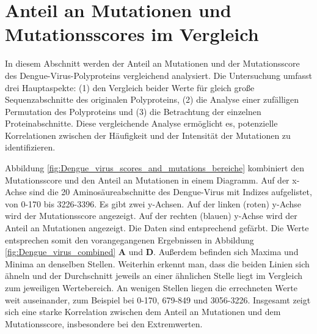 \documentclass[german,version-2022-01]{uzl-thesis}
\begin{document}
\section{Anteil an Mutationen und Mutationsscores im Vergleich}
In diesem Abschnitt werden der Anteil an Mutationen und der Mutationsscore des Dengue-Virus-Polyproteins vergleichend analysiert. Die Untersuchung umfasst drei Hauptaspekte: (1) den Vergleich beider Werte f\"ur gleich gro\ss{}e Sequenzabschnitte des originalen Polyproteins, (2) die Analyse einer zuf\"alligen Permutation des Polyproteins und (3) die Betrachtung der einzelnen Proteinabschnitte. Diese vergleichende Analyse erm\"oglicht es, potenzielle Korrelationen zwischen der H\"aufigkeit und der Intensit\"at der Mutationen zu identifizieren.

Abbildung \ref{fig:Dengue_virus_scores_and_mutations_bereiche} kombiniert den Mutationsscore und den Anteil an Mutationen in einem Diagramm. Auf der x-Achse sind die 20 Aminos\"aureabschnitte des Dengue-Virus mit Indizes aufgelistet, von 0-170 bis 3226-3396. Es gibt zwei y-Achsen. Auf der linken (roten) y-Achse wird der Mutationsscore angezeigt. Auf der rechten (blauen) y-Achse wird der Anteil an Mutationen angezeigt. Die Daten sind entsprechend gef\"arbt. Die Werte entsprechen somit den vorangegangenen Ergebnissen in Abbildung \ref{fig:Dengue_virus_combined} \textbf{A} und \textbf{D}. Au\ss{}erdem befinden sich Maxima und Minima an denselben Stellen. Weiterhin erkennt man, dass die beiden Linien sich \"ahneln und der Durchschnitt jeweils an einer \"ahnlichen Stelle liegt im Vergleich zum jeweiligen Wertebereich. An wenigen Stellen liegen die errechneten Werte weit auseinander, zum Beispiel bei 0-170, 679-849 und 3056-3226. Insgesamt zeigt sich eine starke Korrelation zwischen dem Anteil an Mutationen und dem Mutationsscore, insbesondere bei den Extremwerten.
\end{document}
